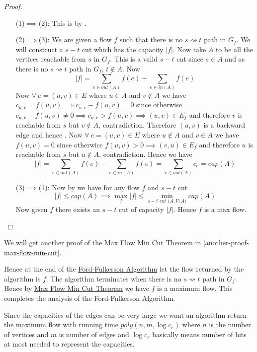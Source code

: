 \begin{proof}
	\begin{itemize}[leftmargin=2cm]
		\item[(1)$\implies$(2):] This is by .
		\item[(2)$\implies$(3):] We are given a flow $f$ such that there is no $s\rightsquigarrow t$ path in $G_f$. We will construct a $s-t$ cut which has the capacity $|f|$. Now take $A$ to be all the vertices reachable from $s$ in $G_f$. This is a valid $s-t$ cut since $s\in A$ and as there is no $s\rightsquigarrow t$ path in $G_f$, $t\notin A$. Now $$|f|=\sum_{e\in \textit{out$(A)$}}f(e)-\sum_{e\in\textit{in$(A)$}}f(e)$$Now $\forall\ e=(u,v)\in E$ where $u\in A$ and $v\notin A$ we have  $c_{u,v}=f(u,v)\implies c_{u,v}-f(u,v)=0$ since otherwise $c_{u,v}-f(u,v)\neq 0\implies c_{u,v}>f(u,v)\implies (u,v)\in E_f$ and therefore $v$ is reachable from $s$ but $v\notin A$, contradiction. Therefore $(u,v)$ is a backward edge and hence . Now $\forall\ e=(u,v)\in E$ where $u\notin A$ and $v\in A$ we have $f(u,v)=0$ since otherwise   $f(u,v)>0\implies (v,u)\in E_f$ and therefore $u$ is reachable from $s$ but $u\notin A$, contradiction. Hence we have $$|f|=\sum_{e\in \textit{out$(A)$}}f(e)-\sum_{e\in\textit{in$(A)$}}f(e)=\sum_{e\in \textit{out$(A)$}}c_e=\textit{cap}(A)$$
		\item[(3)$\implies$(1):] Now by  we have for any flow $f$ and $s-t$ cut $$|f|\leq \textit{cap$(A)$}\implies \max\limits_f|f|\leq\min\limits_{s-t\textit{ cut $(A,V\setminus A$)}}\textit{cap$(A)$}$$Now given $f$ there exists an $s-t$ cut of capacity $|f|$. Hence $f$ is a max flow.
	\end{itemize}
\end{proof}We will get another proof of the \hyperref[maxflowmincut]{Max Flow Min Cut Theorem} in \autoref{another-proof-max-flow-min-cut}. 

Hence at the end of the \hyperref[ford-fulkerson]{Ford-Fulkerson Algorithm} let the flow returned by the algorithm is $f$. The algorithm terminates when there is no $s\rightsquigarrow t$ path in $G_f$. Hence by \hyperref[th:maxflowmincut]{Max Flow Min Cut Theorem} we have $f$ is a maximum flow. This completes the analysis of the Ford-Fulkerson Algorithm.

Since the capacities of the edges can be very large we want an algorithm return the maximum flow with running time $\textit{poly}(n,m,\log c_e)$ where $n$ is the number of vertices and $m$ is number of edges and $\log c_e$ basically means number of bits at most needed to represent the capacities. 

